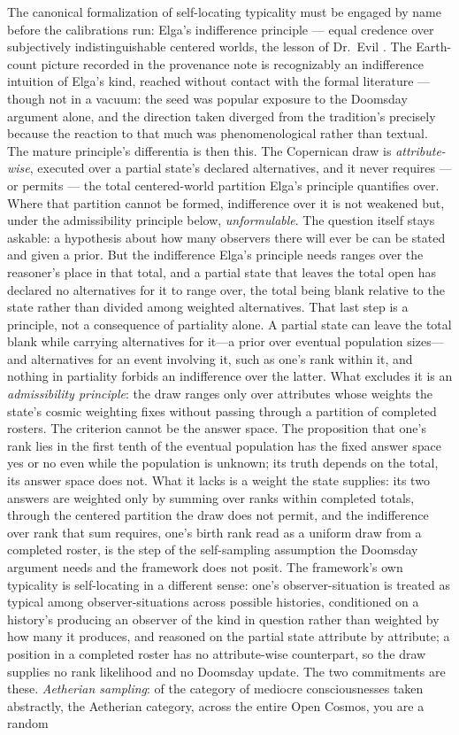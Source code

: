 The canonical formalization of self-locating typicality must be engaged by name before the calibrations run: Elga's indifference principle --- equal credence over subjectively indistinguishable centered worlds, the lesson of Dr.~Evil \cite{elga2004defeating}. The Earth-count picture recorded in the provenance note is recognizably an indifference intuition of Elga's kind, reached without contact with the formal literature --- though not in a vacuum: the seed was popular exposure to the Doomsday argument alone, and the direction taken diverged from the tradition's precisely because the reaction to that much was phenomenological rather than textual. The mature principle's differentia is then this. The Copernican draw is \emph{attribute-wise}, executed over a partial state's declared alternatives, and it never requires --- or permits --- the total centered-world partition Elga's principle quantifies over. Where that partition cannot be formed, indifference over it is not weakened but, under the admissibility principle below, \emph{unformulable}. The question itself stays askable: a hypothesis about how many observers there will ever be can be stated and given a prior. But the indifference Elga's principle needs ranges over the reasoner's place in that total, and a partial state that leaves the total open has declared no alternatives for it to range over, the total being blank relative to the state rather than divided among weighted alternatives. That last step is a principle, not a consequence of partiality alone. A partial state can leave the total blank while carrying alternatives for it---a prior over eventual population sizes---and alternatives for an event involving it, such as one's rank within it, and nothing in partiality forbids an indifference over the latter. What excludes it is an \emph{admissibility principle}: the draw ranges only over attributes whose weights the state's cosmic weighting fixes without passing through a partition of completed rosters. The criterion cannot be the answer space. The proposition that one's rank lies in the first tenth of the eventual population has the fixed answer space yes or no even while the population is unknown; its truth depends on the total, its answer space does not. What it lacks is a weight the state supplies: its two answers are weighted only by summing over ranks within completed totals, through the centered partition the draw does not permit, and the indifference over rank that sum requires, one's birth rank read as a uniform draw from a completed roster, is the step of the self-sampling assumption the Doomsday argument needs and the framework does not posit. The framework's own typicality is self-locating in a different sense: one's observer-situation is treated as typical among observer-situations across possible histories, conditioned on a history's producing an observer of the kind in question rather than weighted by how many it produces, and reasoned on the partial state attribute by attribute; a position in a completed roster has no attribute-wise counterpart, so the draw supplies no rank likelihood and no Doomsday update. The two commitments are these. \emph{Aetherian sampling}: of the category of mediocre consciousnesses taken abstractly, the Aetherian category, across the entire Open Cosmos, you are a random 